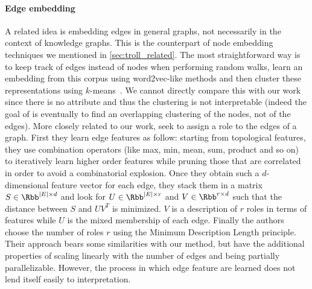 
\paragraph{Edge embedding}
\label{par:erw_embed}

A related idea is embedding edges in general graphs, not necessarily in the context of knowledge
graphs. This is the counterpart of node embedding techniques we mentioned in
\autoref{sec:troll_related}. The most straightforward way is to keep track of edges instead of nodes
when performing random walks, learn an embedding from this corpus using word2vec-like methods and
then cluster these representations using $k$-means~\autocite{edgerep17}. We cannot directly compare
this with our work since there is no attribute and thus the clustering is not interpretable (indeed
the goal of \autocite{edgerep17} is eventually to find an overlapping clustering of the nodes, not
of the edges). More closely related to our work, \textcite{ahmed2017roles} seek to assign a role to the
edges of a graph. First they learn edge features as follow: starting from topological features, they
use combination operators (like max, min, mean, sum, product and so on) to iteratively learn higher
order features while pruning those that are correlated in order to avoid a combinatorial explosion.
Once they obtain such a $d$-dimensional feature vector for each edge, they stack them in a matrix $S
\in \Rbb^{|E|\times d}$ and look for $U\in \Rbb^{|E| \times r}$ and $V\in \Rbb^{r \times d}$ such that the distance
between $S$ and $UV^T$ is minimized. $V$ is a description of $r$ roles in terms of features while
$U$ is the mixed membership of each edge. Finally the authors choose the number of roles $r$ using
the Minimum Description Length principle. Their approach bears some similarities with our \pqt{}
method, but have the additional properties of scaling linearly with the number of
edges and being partially parallelizable. However, the process in which edge feature are learned does not lend
itself easily to interpretation.


